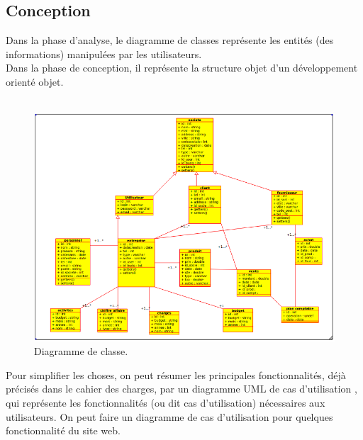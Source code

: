 \documentclass[12pt]{article}
\begin{document}
\subsection{Conception}

Dans la phase d’analyse, le diagramme de classes représente les entités (des informations) manipulées par les utilisateurs.\\
Dans la phase de conception, il représente la structure objet d’un développement orienté objet.\\
\\

\begin{center}
\begin{figure}[htp]
  \centering
  \includegraphics[width=12cm]{dc.png}
  \caption{Diagramme de classe.}
  \label{fig:une-autre-image}
\end{figure}

\end{center}



Pour simplifier les choses, on peut résumer les principales fonctionnalités, déjà précisés dans le cahier des charges, par un diagramme UML de cas d'utilisation , qui  représente les fonctionnalités (ou dit cas d’utilisation) nécessaires aux utilisateurs. On peut faire un diagramme de cas d’utilisation pour quelques 
fonctionnalité du site web. 

\\
\\
\end{document}
